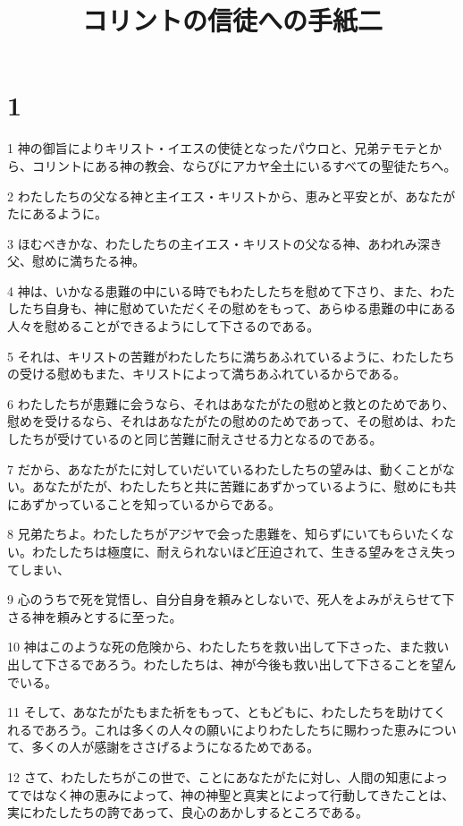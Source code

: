 

\title{コリントの信徒への手紙二}


\chapter{1}

\par 1 神の御旨によりキリスト・イエスの使徒となったパウロと、兄弟テモテとから、コリントにある神の教会、ならびにアカヤ全土にいるすべての聖徒たちへ。
\par 2 わたしたちの父なる神と主イエス・キリストから、恵みと平安とが、あなたがたにあるように。
\par 3 ほむべきかな、わたしたちの主イエス・キリストの父なる神、あわれみ深き父、慰めに満ちたる神。
\par 4 神は、いかなる患難の中にいる時でもわたしたちを慰めて下さり、また、わたしたち自身も、神に慰めていただくその慰めをもって、あらゆる患難の中にある人々を慰めることができるようにして下さるのである。
\par 5 それは、キリストの苦難がわたしたちに満ちあふれているように、わたしたちの受ける慰めもまた、キリストによって満ちあふれているからである。
\par 6 わたしたちが患難に会うなら、それはあなたがたの慰めと救とのためであり、慰めを受けるなら、それはあなたがたの慰めのためであって、その慰めは、わたしたちが受けているのと同じ苦難に耐えさせる力となるのである。
\par 7 だから、あなたがたに対していだいているわたしたちの望みは、動くことがない。あなたがたが、わたしたちと共に苦難にあずかっているように、慰めにも共にあずかっていることを知っているからである。
\par 8 兄弟たちよ。わたしたちがアジヤで会った患難を、知らずにいてもらいたくない。わたしたちは極度に、耐えられないほど圧迫されて、生きる望みをさえ失ってしまい、
\par 9 心のうちで死を覚悟し、自分自身を頼みとしないで、死人をよみがえらせて下さる神を頼みとするに至った。
\par 10 神はこのような死の危険から、わたしたちを救い出して下さった、また救い出して下さるであろう。わたしたちは、神が今後も救い出して下さることを望んでいる。
\par 11 そして、あなたがたもまた祈をもって、ともどもに、わたしたちを助けてくれるであろう。これは多くの人々の願いによりわたしたちに賜わった恵みについて、多くの人が感謝をささげるようになるためである。
\par 12 さて、わたしたちがこの世で、ことにあなたがたに対し、人間の知恵によってではなく神の恵みによって、神の神聖と真実とによって行動してきたことは、実にわたしたちの誇であって、良心のあかしするところである。
